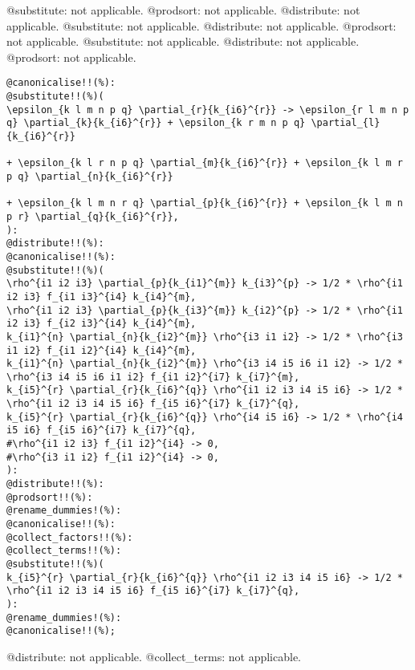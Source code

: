 \documentclass[11pt]{article}
\begin{document}
@substitute: not applicable.
@prodsort: not applicable.
@distribute: not applicable.
@substitute: not applicable.
@distribute: not applicable.
@prodsort: not applicable.
@substitute: not applicable.
@distribute: not applicable.
@prodsort: not applicable.
{\color[named]{Blue}\begin{verbatim}
@canonicalise!!(%):
@substitute!!(%)(
\epsilon_{k l m n p q} \partial_{r}{k_{i6}^{r}} -> \epsilon_{r l m n p q} \partial_{k}{k_{i6}^{r}} + \epsilon_{k r m n p q} \partial_{l}{k_{i6}^{r}}
                                                                              + \epsilon_{k l r n p q} \partial_{m}{k_{i6}^{r}} + \epsilon_{k l m r p q} \partial_{n}{k_{i6}^{r}}
                                                                              + \epsilon_{k l m n r q} \partial_{p}{k_{i6}^{r}} + \epsilon_{k l m n p r} \partial_{q}{k_{i6}^{r}},
):
@distribute!!(%):
@canonicalise!!(%):
@substitute!!(%)(
\rho^{i1 i2 i3} \partial_{p}{k_{i1}^{m}} k_{i3}^{p} -> 1/2 * \rho^{i1 i2 i3} f_{i1 i3}^{i4} k_{i4}^{m},
\rho^{i1 i2 i3} \partial_{p}{k_{i3}^{m}} k_{i2}^{p} -> 1/2 * \rho^{i1 i2 i3} f_{i2 i3}^{i4} k_{i4}^{m},
k_{i1}^{n} \partial_{n}{k_{i2}^{m}} \rho^{i3 i1 i2} -> 1/2 * \rho^{i3 i1 i2} f_{i1 i2}^{i4} k_{i4}^{m},
k_{i1}^{n} \partial_{n}{k_{i2}^{m}} \rho^{i3 i4 i5 i6 i1 i2} -> 1/2 * \rho^{i3 i4 i5 i6 i1 i2} f_{i1 i2}^{i7} k_{i7}^{m},
k_{i5}^{r} \partial_{r}{k_{i6}^{q}} \rho^{i1 i2 i3 i4 i5 i6} -> 1/2 * \rho^{i1 i2 i3 i4 i5 i6} f_{i5 i6}^{i7} k_{i7}^{q},
k_{i5}^{r} \partial_{r}{k_{i6}^{q}} \rho^{i4 i5 i6} -> 1/2 * \rho^{i4 i5 i6} f_{i5 i6}^{i7} k_{i7}^{q},
#\rho^{i1 i2 i3} f_{i1 i2}^{i4} -> 0,
#\rho^{i3 i1 i2} f_{i1 i2}^{i4} -> 0,
):
@distribute!!(%):
@prodsort!!(%):
@rename_dummies!(%):
@canonicalise!!(%):
@collect_factors!!(%):
@collect_terms!!(%):
@substitute!!(%)(
k_{i5}^{r} \partial_{r}{k_{i6}^{q}} \rho^{i1 i2 i3 i4 i5 i6} -> 1/2 * \rho^{i1 i2 i3 i4 i5 i6} f_{i5 i6}^{i7} k_{i7}^{q},
):
@rename_dummies!(%):
@canonicalise!!(%);
\end{verbatim}}
@distribute: not applicable.
@collect\_terms: not applicable.
\end{document}

